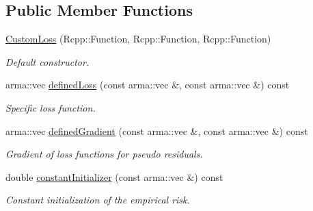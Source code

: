 \subsection*{Public Member Functions}
\begin{DoxyCompactItemize}
\item 
\mbox{\hyperlink{classloss_1_1_custom_loss_ae3e34f8cab5f6c317412a32f27542f92}{Custom\+Loss}} (Rcpp\+::\+Function, Rcpp\+::\+Function, Rcpp\+::\+Function)
\begin{DoxyCompactList}\small\item\em Default constructor. \end{DoxyCompactList}\item 
arma\+::vec \mbox{\hyperlink{classloss_1_1_custom_loss_a2a96bc5e4b4894bbaa64745a3f7c0fd5}{defined\+Loss}} (const arma\+::vec \&, const arma\+::vec \&) const
\begin{DoxyCompactList}\small\item\em Specific loss function. \end{DoxyCompactList}\item 
arma\+::vec \mbox{\hyperlink{classloss_1_1_custom_loss_a3a79dc019e781c2956b52fb8e1cfcc56}{defined\+Gradient}} (const arma\+::vec \&, const arma\+::vec \&) const
\begin{DoxyCompactList}\small\item\em Gradient of loss functions for pseudo residuals. \end{DoxyCompactList}\item 
double \mbox{\hyperlink{classloss_1_1_custom_loss_adf283025a8511731504cd5b620cc8b37}{constant\+Initializer}} (const arma\+::vec \&) const
\begin{DoxyCompactList}\small\item\em Constant initialization of the empirical risk. \end{DoxyCompactList}\end{DoxyCompactItemize}
